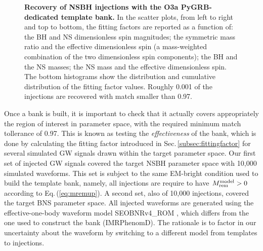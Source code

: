 \documentclass[binding=0.6cm, LaM]{sapthesis}
\begin{document}
        \begin{figure}[!t]
          \noindent
          \centering
          \caption{{\bf Recovery of NSBH injections with the O3a {\ttfamily PyGRB}-dedicated template bank.}  In the scatter plots, from left to right and top to bottom, the fitting factors are reported as a function of: the BH and NS dimensionless spin magnitudes; the symmetric mass ratio and the effective dimensionless spin (a mass-weighted combination of the two dimensionless spin components); the BH and the NS masses; the NS mass and the effective dimensionless spin.  The bottom histograms show the distribution and cumulative distribution of the fitting factor values.  Roughly 0.001 of the injections are recovered with match smaller than 0.97.}
          \label{fig:fittingfactor}
        \end{figure}

	Once a bank is built, it is important to check that it actually covers appropriately the region of interest in parameter space, with the required minimum match tollerance of 0.97.
        This is known as testing the \emph{effectiveness} of the bank,
        which is done by calculating the fitting factor introduced in Sec.\,\ref{subsec:fittingfactor} for several simulated GW signals drawn within the target parameter space.
        Our first set of injected GW signals covered the target NSBH parameter space with 10,000 simulated waveforms.
        This set is subject to the same EM-bright condition used to build the template bank, namely, all injections are require to have $M_{\rm rem}^{\rm model}>0$ according to Eq.\,(\ref{eq:mremup}).
        A second set, also of 10,000 injections, covered the target BNS parameter space.
        All injected waveforms are generated using the effective-one-body waveform model {\ttfamily SEOBNRv4\_ROM} \cite{172}, which differs from the one used to construct the bank ({\ttfamily IMRPhenomD}).  The rationale is to factor in our uncertainty about the waveform by switching to a different model from templates to injections.
\end{document}
